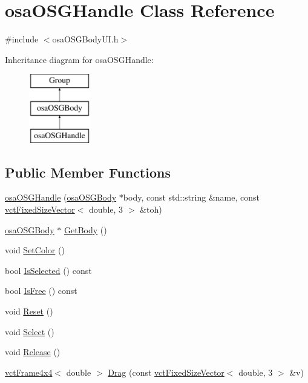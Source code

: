 \hypertarget{classosa_o_s_g_handle}{}\section{osa\+O\+S\+G\+Handle Class Reference}
\label{classosa_o_s_g_handle}


{\ttfamily \#include $<$osa\+O\+S\+G\+Body\+U\+I.\+h$>$}

Inheritance diagram for osa\+O\+S\+G\+Handle\+:\begin{figure}[H]
\begin{center}
\leavevmode
\includegraphics[height=3.000000cm]{d4/d1b/classosa_o_s_g_handle}
\end{center}
\end{figure}
\subsection*{Public Member Functions}
\begin{DoxyCompactItemize}
\item 
\hyperlink{classosa_o_s_g_handle_a1c41a8a104297687d2379776a1700ba1}{osa\+O\+S\+G\+Handle} (\hyperlink{classosa_o_s_g_body}{osa\+O\+S\+G\+Body} $\ast$body, const std\+::string \&name, const \hyperlink{classvct_fixed_size_vector}{vct\+Fixed\+Size\+Vector}$<$ double, 3 $>$ \&toh)
\item 
\hyperlink{classosa_o_s_g_body}{osa\+O\+S\+G\+Body} $\ast$ \hyperlink{classosa_o_s_g_handle_a781738b3fcddd63662936ec005c66fba}{Get\+Body} ()
\item 
void \hyperlink{classosa_o_s_g_handle_ac9fce94aee665eec649ac5898358734e}{Set\+Color} ()
\item 
bool \hyperlink{classosa_o_s_g_handle_a2ffe950682a035236ca3b42869cc0079}{Is\+Selected} () const 
\item 
bool \hyperlink{classosa_o_s_g_handle_a347f22c18ac0dfb6740bd46555eeedd2}{Is\+Free} () const 
\item 
void \hyperlink{classosa_o_s_g_handle_a8be505212363f12340e82b36c5344ef6}{Reset} ()
\item 
void \hyperlink{classosa_o_s_g_handle_a2fa1176a53f33269298741146e960296}{Select} ()
\item 
void \hyperlink{classosa_o_s_g_handle_ad08ce5abb32e5582870402240ea5719d}{Release} ()
\item 
\hyperlink{classvct_frame4x4}{vct\+Frame4x4}$<$ double $>$ \hyperlink{classosa_o_s_g_handle_a11cdeccb1dc23536ab8447b736dfc6a3}{Drag} (const \hyperlink{classvct_fixed_size_vector}{vct\+Fixed\+Size\+Vector}$<$ double, 3 $>$ \&v)
\end{DoxyCompactItemize}
